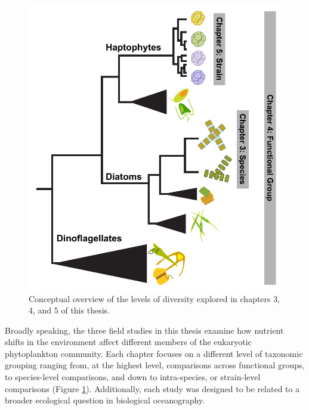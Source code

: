 \begin{figure}[t!]
  \centering
    \includegraphics[width=.75\textwidth]{Images/C1_ThesisDiagram.pdf}
    \caption{Conceptual overview of the levels of diversity explored in chapters 3, 4, and 5 of this thesis.}
  \label{fig:c1f1}
\end{figure}

Broadly speaking, the three field studies in this thesis examine how nutrient shifts in the environment affect different members of the eukaryotic phytoplankton community. Each chapter focuses on a different level of taxonomic grouping ranging from, at the highest level, comparisons across functional groups, to species-level comparisons, and down to intra-species, or strain-level comparisons (Figure \ref{fig:c1f1}). Additionally, each study was designed to be related to a broader ecological question in biological oceanography. \par 

